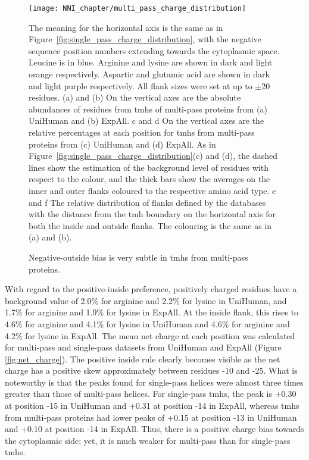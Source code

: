 \begin{figure}[!p]
\centering
\texttt{[image: NNI\_chapter/multi\_pass\_charge\_distribution]}
\caption{ Negative-outside bias is very subtle in \gls{tmh}s from multi-pass proteins.}

\medskip
\small
\justify

The meaning for the horizontal axis is the same as in Figure~\ref{fig:single_pass_charge_distribution}, with the negative sequence position numbers extending towards the cytoplasmic space. Leucine is in blue. Arginine and lysine are shown in dark and light orange respectively. Aspartic and glutamic acid are shown in dark and light purple respectively. All flank sizes were set at up to $\pm$20 residues. (a) and (b) On the vertical axes are the absolute abundances of residues from \gls{tmh}s of multi-pass proteins from (a) UniHuman and (b) ExpAll. c and d On the vertical axes are the relative percentages at each position for \gls{tmh}s from multi-pass proteins from (c) UniHuman and (d) ExpAll. As in Figure~\ref{fig:single_pass_charge_distribution}(c) and (d), the dashed lines show the estimation of the background level of residues with respect to the colour, and the thick bars show the averages on the inner and outer flanks coloured to the respective amino acid type. e and f The relative distribution of flanks defined by the databases with the distance from the \gls{tmh} boundary on the horizontal axis for both the inside and outside flanks. The colouring is the same as in (a) and (b).
\label{fig:multi_pass_charge_distribution}
\end{figure}

With regard to the positive-inside preference, positively charged residues have a background value of 2.0\% for arginine and 2.2\% for lysine in UniHuman, and 1.7\% for arginine and 1.9\% for lysine in ExpAll. At the inside flank, this rises to 4.6\% for arginine and 4.1\% for lysine in UniHuman and 4.6\% for arginine and 4.2\% for lysine in ExpAll. The mean net charge at each position was calculated for multi-pass and single-pass datasets from UniHuman and ExpAll (Figure \ref{fig:net_charge}). The positive inside rule clearly becomes visible as the net charge has a positive skew approximately between residues -10 and -25. What is noteworthy is that the peaks found for single-pass helices were almost three times greater than those of multi-pass helices. For single-pass \gls{tmh}s, the peak is +0.30 at position -15 in UniHuman and +0.31 at position -14 in ExpAll, whereas \gls{tmh}s from multi-pass proteins had lower peaks of +0.15 at position -13 in UniHuman and +0.10 at position -14 in ExpAll. Thus, there is a positive charge bias towards the cytoplasmic side; yet, it is much weaker for multi-pass than for single-pass \gls{tmh}s.

